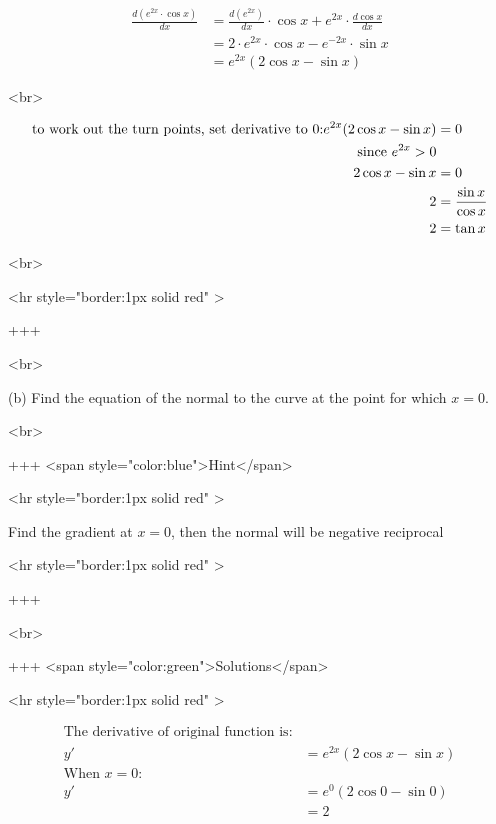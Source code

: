 $$
\begin{aligned}
\frac{d\left(e^{2 x} \cdot \cos x\right)}{dx} & =\frac{d\left(e^{2 x}\right)}{d x} \cdot \cos x+e^{2 x} \cdot \frac{d \cos x}{d x} \\
& =2\cdot e^{2 x} \cdot \cos x - e^{-2 x} \cdot \sin x\\
&=e^{2x}(2\cos {x}-\sin{x})
\end{aligned}
$$

<br>

$$
\begin{aligned}
\text{to work out the turn points, set derivative to 0:}
\newline
e^{2x}(2\cos {x}-\sin{x})&=0\\
\text{since $e^{2x} > 0$}\\
2\cos {x}-\sin{x}&=0\\
2&=\frac{\sin x}{\cos x}\\
2&=\tan x
\end{aligned}
$$

<br>

<hr style="border:1px solid red" >

+++

<br>

(b) Find the equation of the normal to the curve at the point for which $x=0$.

<br>

+++ <span style="color:blue">Hint</span>

<hr style="border:1px solid red" >

Find the gradient at $x=0$, then the normal will be negative reciprocal

<hr style="border:1px solid red" >

+++

<br>

+++ <span style="color:green">Solutions</span>

<hr style="border:1px solid red" >

$$
\begin{aligned}
\text{The derivative of original function is:}\\
y'&=e^{2x}(2\cos {x}-\sin{x})\\
\text{When $x=0$:}\\
y'&=e^0(2\cos 0 - \sin 0)\\
&=2
\end{aligned}
$$

